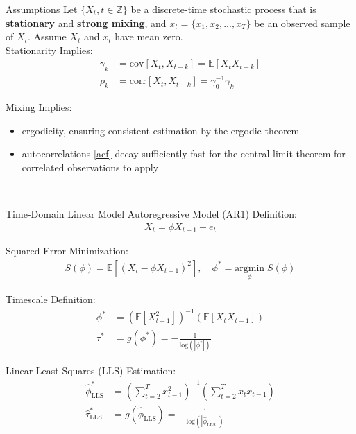 \documentclass[8pt,aspectratio=169]{beamer}
\begin{document}
\begin{frame}{Assumptions}
Let $\{X_t, t\in \mathbb{Z}\}$ be a discrete-time stochastic process that is \textbf{stationary} and \textbf{strong mixing}, and $x_t = \{x_1, x_2, ..., x_T\}$ be an observed sample of $X_t$. Assume $X_t$ and $x_t$ have mean zero.\\
\vfill
Stationarity Implies:
\begin{align}
    \gamma_k &= \text{cov}[X_t, X_{t-k}] = \mathbb{E}[X_t X_{t-k}]\\
    \rho_k &= \text{corr}[X_t, X_{t-k}] = \gamma_0^{-1}\gamma_k\label{acf}
\end{align}

Mixing Implies:
\begin{itemize}
    \item ergodicity, ensuring consistent estimation by the ergodic theorem
    \item autocorrelations \eqref{acf} decay sufficiently fast for the central limit theorem for correlated observations to apply
\end{itemize}
\vfill
\citet{hansen_econometrics_2022, white_nonlinear_1984, newey_simple_1987}\\
\end{frame}

\begin{frame}{Time-Domain Linear Model}
\vfill
Autoregressive Model (AR1) Definition:
\begin{align}
    X_t = \phi X_{t-1} + e_t
\end{align}

Squared Error Minimization:
\begin{align}
    S(\phi) = \mathbb{E}[(X_t - \phi X_{t-1})^2],\quad \phi^* = \underset{\phi}{\text{argmin}} \; S(\phi)
\end{align}

Timescale Definition:
\begin{align}
    \phi^* &= (\mathbb{E}[X_{t-1}^2])^{-1}(\mathbb{E}[X_t X_{t-1}])\\
    \tau^* &= g(\phi^*) = -\frac{1}{\text{log}(|\phi^*|)}
\end{align}

Linear Least Squares (LLS) Estimation:
\begin{align}
    \hat\phi^*_{\scriptscriptstyle\text{LLS}} &= \left(\sum_{t=2}^T x_{t-1}^2\right)^{-1} \left(\sum_{t=2}^T x_t x_{t-1}\right)\\
    \hat\tau^*_{\scriptscriptstyle\text{LLS}} &= g(\hat\phi_{\scriptscriptstyle\text{LLS}}) = -\frac{1}{\text{log}(|\hat\phi_{\scriptscriptstyle\text{LLS}}|)}
\end{align}

\end{frame}
\end{document}
